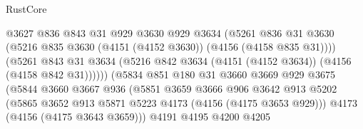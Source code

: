 \begin{lexlean}{RustCore}
\begin{coremodule}
                                    @3627
                                    @836
                                    @843
                                    @31
                                    @929
                                    @3630
                                    @929
                                    @3634
                                    (@5261
                                      @836
                                      @31
                                      @3630
                                      (@5216
                                        @835
                                        @3630
                                        (@4151 (@4152 @3630))
                                        (@4156 (@4158 @835 @31))))
                                    (@5261
                                      @843
                                      @31
                                      @3634
                                      (@5216
                                        @842
                                        @3634
                                        (@4151 (@4152 @3634))
                                        (@4156 (@4158 @842 @31))))))
                                (@5834
                                  @851
                                  @180
                                  @31
                                  @3660
                                  @3669
                                  @929
                                  @3675
                                  (@5844
                                    @3660
                                    @3667
                                    @936
                                    (@5851
                                      @3659
                                      @3666
                                      @906
                                      @3642
                                      @913
                                      @5202
                                      (@5865
                                        @3652
                                        @913
                                        @5871
                                        @5223
                                        @4173
                                        (@4156 (@4175 @3653 @929)))
                                      @4173
                                      (@4156 (@4175 @3643 @3659)))
                                    @4191
                                    @4195
                                    @4200
                                    @4205

\end{coremodule}
\end{lexlean}
